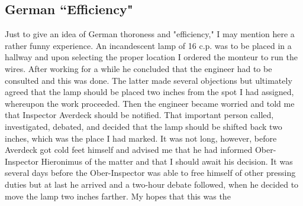 \documentclass[a4paper,12pt,english,twoside,openright]{memoir}
\begin{document}
\subsection{German ``Efficiency"}
Just to give an idea of German thoroness and "efficiency," I may mention here a rather funny 
experience.  An incandescent lamp of 16 c.p.  was to be placed in a hallway and upon selecting 
the proper location I ordered the monteur to run the wires.  After working for a while he concluded 
that the engineer had to be consulted and this was done.  The latter made several objections but 
ultimately agreed that the lamp should be placed two inches from the spot I had assigned, 
whereupon the work proceeded.  Then the engineer became worried and told me that Inspector 
Averdeck should be notified.  That important person called, investigated, debated, and decided 
that the lamp should be shifted back two inches, which was the place I had marked.  It was not 
long, however, before Averdeck got cold feet himself and advised me that he had informed Ober-
Inspector Hieronimus of the matter and that I should await his decision.  It was several days 
before the Ober-Inspector was able to free himself of other pressing duties but at last he arrived 
and a two-hour debate followed, when he decided to move the lamp two inches farther.  My hopes that this was the 
\end{document}
